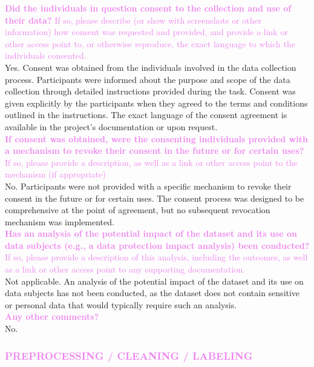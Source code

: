 \documentclass{article}
\newcommand{\sectioncolor}{Violet}
\begin{document}
    \textcolor{\sectioncolor}{\textbf{
    Did the individuals in question consent to the collection and use of their
    data?
    }
    If so, please describe (or show with screenshots or other information) how
    consent was requested and provided, and provide a link or other access
    point to, or otherwise reproduce, the exact language to which the
    individuals consented.
    } \\
    Yes. Consent was obtained from the individuals involved in the data collection process. Participants were informed about the purpose and scope of the data collection through detailed instructions provided during the task. Consent was given explicitly by the participants when they agreed to the terms and conditions outlined in the instructions. The exact language of the consent agreement is available in the project's documentation or upon request.\\
    
    \textcolor{\sectioncolor}{\textbf{
    If consent was obtained, were the consenting individuals provided with a
    mechanism to revoke their consent in the future or for certain uses?
    }
     If so, please provide a description, as well as a link or other access
     point to the mechanism (if appropriate)
    } \\
    No. Participants were not provided with a specific mechanism to revoke their consent in the future or for certain uses. The consent process was designed to be comprehensive at the point of agreement, but no subsequent revocation mechanism was implemented.\\
    
    \textcolor{\sectioncolor}{\textbf{
    Has an analysis of the potential impact of the dataset and its use on data
    subjects (e.g., a data protection impact analysis) been conducted?
    }
    If so, please provide a description of this analysis, including the
    outcomes, as well as a link or other access point to any supporting
    documentation.
    } \\
    Not applicable. An analysis of the potential impact of the dataset and its use on data subjects has not been conducted, as the dataset does not contain sensitive or personal data that would typically require such an analysis.\\

    
    \textcolor{\sectioncolor}{\textbf{
    Any other comments?
    }} \\
    No.
\begin{mdframed}[linecolor=\sectioncolor]
\subsubsection*{\textcolor{\sectioncolor}{
    PREPROCESSING / CLEANING / LABELING
}}
\end{mdframed}
\end{document}

